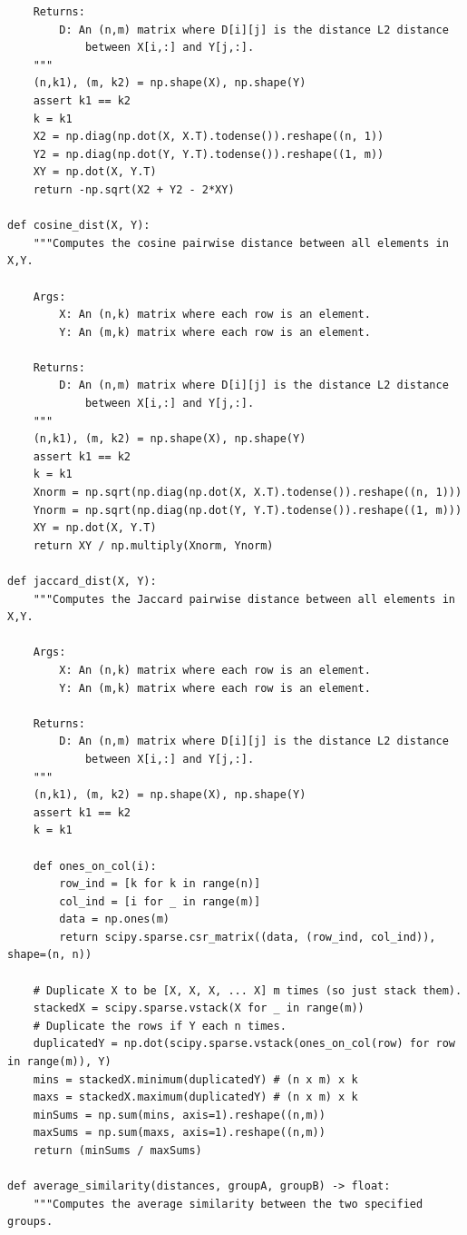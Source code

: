 \documentclass[12pt]{article}
\begin{document}
\begin{enumerate}[label=(\alph*)]
\begin{verbatim}
    Returns:
        D: An (n,m) matrix where D[i][j] is the distance L2 distance
            between X[i,:] and Y[j,:].
    """
    (n,k1), (m, k2) = np.shape(X), np.shape(Y)
    assert k1 == k2
    k = k1
    X2 = np.diag(np.dot(X, X.T).todense()).reshape((n, 1))
    Y2 = np.diag(np.dot(Y, Y.T).todense()).reshape((1, m))
    XY = np.dot(X, Y.T)
    return -np.sqrt(X2 + Y2 - 2*XY)

def cosine_dist(X, Y):
    """Computes the cosine pairwise distance between all elements in X,Y.
    
    Args:
        X: An (n,k) matrix where each row is an element.
        Y: An (m,k) matrix where each row is an element.
        
    Returns:
        D: An (n,m) matrix where D[i][j] is the distance L2 distance
            between X[i,:] and Y[j,:].
    """
    (n,k1), (m, k2) = np.shape(X), np.shape(Y)
    assert k1 == k2
    k = k1
    Xnorm = np.sqrt(np.diag(np.dot(X, X.T).todense()).reshape((n, 1)))
    Ynorm = np.sqrt(np.diag(np.dot(Y, Y.T).todense()).reshape((1, m)))
    XY = np.dot(X, Y.T)
    return XY / np.multiply(Xnorm, Ynorm)

def jaccard_dist(X, Y):
    """Computes the Jaccard pairwise distance between all elements in X,Y.
    
    Args:
        X: An (n,k) matrix where each row is an element.
        Y: An (m,k) matrix where each row is an element.
        
    Returns:
        D: An (n,m) matrix where D[i][j] is the distance L2 distance
            between X[i,:] and Y[j,:].
    """
    (n,k1), (m, k2) = np.shape(X), np.shape(Y)
    assert k1 == k2
    k = k1
    
    def ones_on_col(i):
        row_ind = [k for k in range(n)]
        col_ind = [i for _ in range(m)]
        data = np.ones(m)
        return scipy.sparse.csr_matrix((data, (row_ind, col_ind)), shape=(n, n))
    
    # Duplicate X to be [X, X, X, ... X] m times (so just stack them).
    stackedX = scipy.sparse.vstack(X for _ in range(m))
    # Duplicate the rows if Y each n times.
    duplicatedY = np.dot(scipy.sparse.vstack(ones_on_col(row) for row in range(m)), Y)
    mins = stackedX.minimum(duplicatedY) # (n x m) x k
    maxs = stackedX.maximum(duplicatedY) # (n x m) x k
    minSums = np.sum(mins, axis=1).reshape((n,m))
    maxSums = np.sum(maxs, axis=1).reshape((n,m))
    return (minSums / maxSums)

def average_similarity(distances, groupA, groupB) -> float:
    """Computes the average similarity between the two specified groups.
    

\end{verbatim}
\end{enumerate}
\end{document}
